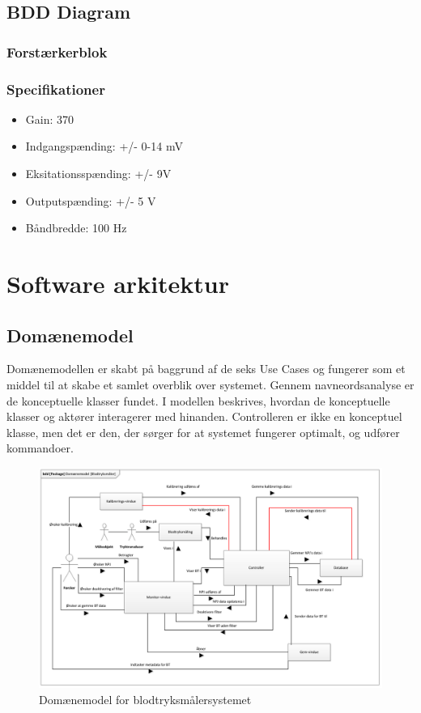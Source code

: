  \subsection{BDD Diagram}
  
 
 \subsubsection{Forstærkerblok}
 \subsubsection{Specifikationer}
 \begin{itemize}
 	\item Gain: 370
 	\item Indgangspænding: +/- 0-14 mV
 	\item Eksitationsspænding: +/- 9V
 	\item Outputspænding: +/- 5 V
 	\item Båndbredde: 100 Hz
 \end{itemize}

\section{Software arkitektur}

\subsection{Domænemodel}
Domænemodellen er skabt på baggrund af de seks Use Cases og fungerer som et middel til at skabe et samlet overblik over systemet. Gennem navneordsanalyse er de konceptuelle klasser fundet. I modellen beskrives, hvordan de konceptuelle klasser og aktører interagerer med hinanden. Controlleren er ikke en konceptuel klasse, men det er den, der sørger for at systemet fungerer optimalt, og udfører kommandoer.

\begin{figure}[H]
	\centering
	\includegraphics[width=1 \textwidth]{Figurer/Snip20151104_30}
	\caption{Domænemodel for blodtryksmålersystemet}
\end{figure}

